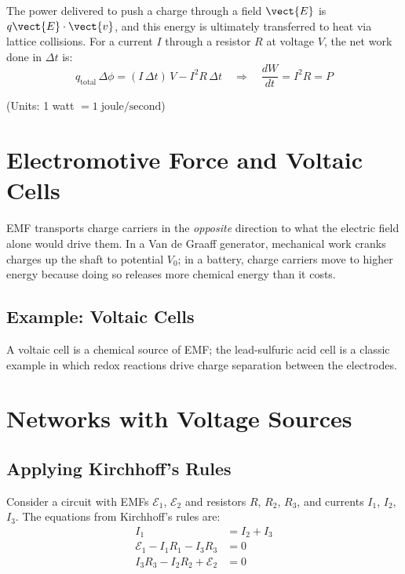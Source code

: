 The power delivered to push a charge through a field $\vect{E}$ is $q\vect{E}\cdot\vect{v}$, and this energy is ultimately transferred to heat via lattice collisions. For a current $I$ through a resistor $R$ at voltage $V$, the net work done in $\Delta t$ is:
\[
    q_\text{total}\,\Delta\phi = (I\,\Delta t)\,V - I^2 R\,\Delta t
    \quad\Rightarrow\quad \boxed{\frac{dW}{dt} = I^2 R = P}
\]

(Units: 1 watt $= 1\;\text{joule/second}$)

\section{Electromotive Force and Voltaic Cells}

EMF transports charge carriers in the \emph{opposite} direction to what the electric field alone would drive them. In a Van de Graaff generator, mechanical work cranks charges up the shaft to potential $V_0$; in a battery, charge carriers move to higher energy because doing so releases more chemical energy than it costs.

\subsection{Example: Voltaic Cells}

A voltaic cell is a chemical source of EMF; the lead-sulfuric acid cell is a classic example in which redox reactions drive charge separation between the electrodes.

\section{Networks with Voltage Sources}

\subsection{Applying Kirchhoff's Rules}

\begin{example}
Consider a circuit with EMFs $\mathcal{E}_1$, $\mathcal{E}_2$ and resistors $R$, $R_2$, $R_3$, and currents $I_1$, $I_2$, $I_3$. The equations from Kirchhoff's rules are:
\begin{align*}
    I_1 &= I_2 + I_3 \\
    \mathcal{E}_1 - I_1 R_1 - I_3 R_3 &= 0 \\
    I_3 R_3 - I_2 R_2 + \mathcal{E}_2 &= 0
\end{align*}
\end{example}

